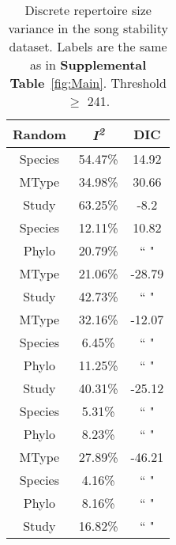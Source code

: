 \documentclass{article}
\begin{document}
  \begin{table}[H]
  \centering
  \caption{Discrete repertoire size variance in the song stability dataset. Labels are the same as in \textbf{Supplemental Table}~\ref{fig:Main}. Threshold $\ge$ 241.} 
  \begin{tabular}{ccc}
  \hline
  Random & \textit{I\textsuperscript{2}} & DIC \\ 
  \hline
  Species & 54.47\% & 14.92 \\ \hdashline
  MType & 34.98\% & 30.66 \\ \hdashline
  Study & 63.25\% & -8.2 \\ \hdashline
  Species & 12.11\% & 10.82 \\ 
  Phylo & 20.79\% & `` " \\ \hdashline
  MType & 21.06\% & -28.79 \\ 
  Study & 42.73\% & `` " \\ \hdashline
  MType & 32.16\% & -12.07 \\ 
  Species & 6.45\% & `` " \\ 
  Phylo & 11.25\% & `` " \\ \hdashline
  Study & 40.31\% & -25.12 \\ 
  Species & 5.31\% & `` " \\ 
  Phylo & 8.23\% & `` " \\ \hdashline
  MType & 27.89\% & -46.21 \\ 
  Species & 4.16\% & `` " \\ 
  Phylo & 8.16\% & `` " \\ 
  Study & 16.82\% & `` " \\ 
  \hline
  \end{tabular}
  \end{table}
\end{document}

